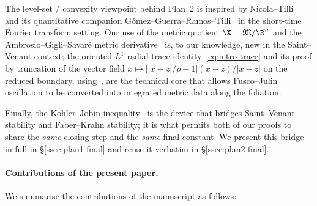 The level-set / convexity viewpoint behind Plan~2 is inspired by
Nicola--Tilli~\cite{NicolaTilli2022} and its quantitative companion
Gómez--Guerra--Ramos--Tilli~\cite{GGRT2024} in the short-time Fourier
transform setting. Our use of the metric quotient $\X=\mathfrak
M/\R^n$ and the Ambrosio--Gigli--Savar\'e metric
derivative~\cite{AGS2008} is, to our knowledge, new in the
Saint--Venant context; the oriented $L^1$-radial trace
identity~\eqref{eq:intro-trace} and its proof by truncation of the
vector field $x\mapsto||x-z|/\rho-1|(x-z)/|x-z|$ on the reduced
boundary, using~\cite[Thm~16.3]{Maggi2012}, are the technical core
that allows Fusco--Julin oscillation to be converted into integrated
metric data along the foliation.

Finally, the Kohler--Jobin
inequality~\cite{KohlerJobin1978,Brasco2014} is the
device that bridges Saint--Venant stability and Faber--Krahn
stability; it is what permits both of our proofs to share the
\emph{same} closing step and the \emph{same} final constant. We
present this bridge in full in \S\ref{ssec:plan1-final} and reuse it
verbatim in \S\ref{ssec:plan2-final}.

\paragraph{Contributions of the present paper.}
We summarise the contributions of the manuscript as follows:

